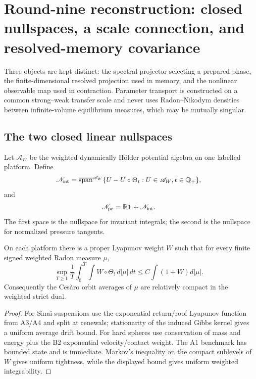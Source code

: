 \section{Round-nine reconstruction: closed nullspaces, a scale connection, and resolved-memory covariance}
\label{sec:r9-c2}

Three objects are kept distinct: the spectral projector selecting a prepared
phase, the finite-dimensional resolved projection used in memory, and the
nonlinear observable map used in contraction.  Parameter transport is
constructed on a common strong--weak transfer scale and never uses
Radon--Nikodym densities between infinite-volume equilibrium measures, which
may be mutually singular.

\subsection{The two closed linear nullspaces}

Let $\mathscr A_W$ be the weighted dynamically H\"older potential algebra on
one labelled platform.  Define
\[
 \mathscr N_{\rm int}
 =\overline{\operatorname{span}}^{\mathscr A_W}
 \{U-U\circ\Theta_t:U\in\mathscr A_W,
   t\in\mathbb Q_+\},
\]
and
\[
 \mathscr N_{\rm pr}=\mathbb R\mathbf1+\mathscr N_{\rm int}.
\]
The first space is the nullspace for invariant integrals; the second is the
nullspace for normalized pressure tangents.

\begin{lemma}
\label{lem:r9-c2-cesaro}
On each platform there is a proper Lyapunov weight $W$ such that for every
finite signed weighted Radon measure $\mu$,
\[
 \sup_{T\ge1}
 \frac1T\int_0^T
  \int W\circ\Theta_t\,d|\mu|\,dt
 \le C\int(1+W)d|\mu|.
\]
Consequently the Ces\`aro orbit averages of $\mu$ are relatively compact in
the weighted strict dual.
\end{lemma}

\begin{proof}
For Sinai suspensions use the exponential return/roof Lyapunov function from
A3/A4 and split at renewals; stationarity of the induced Gibbs kernel gives a
uniform average drift bound.  For hard spheres use conservation of mass and
energy plus the B2 exponential velocity/contact weight.  The A1 benchmark has
bounded state and is immediate.  Markov's inequality on the compact sublevels
of $W$ gives uniform tightness, while the displayed bound gives uniform
weighted integrability.
\end{proof}

